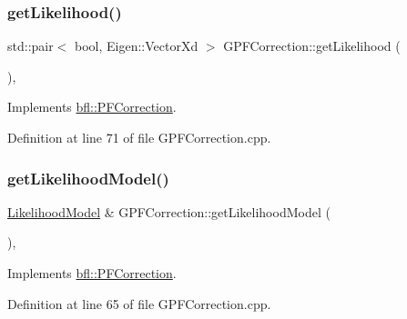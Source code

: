 \subsubsection{\texorpdfstring{get\+Likelihood()}{getLikelihood()}}
{\footnotesize\ttfamily std\+::pair$<$ bool, Eigen\+::\+Vector\+Xd $>$ G\+P\+F\+Correction\+::get\+Likelihood (\begin{DoxyParamCaption}{ }\end{DoxyParamCaption})\hspace{0.3cm}{\ttfamily [override]}, {\ttfamily [virtual]}}



Implements \mbox{\hyperlink{classbfl_1_1PFCorrection_ab6eca766077c4ab1db3417dab6c44d27}{bfl\+::\+P\+F\+Correction}}.



Definition at line 71 of file G\+P\+F\+Correction.\+cpp.

\mbox{\label{classbfl_1_1GPFCorrection_afa1e971c9b618c50bd98f1d5774cff3a}} 
\subsubsection{\texorpdfstring{get\+Likelihood\+Model()}{getLikelihoodModel()}}
{\footnotesize\ttfamily \mbox{\hyperlink{classbfl_1_1LikelihoodModel}{Likelihood\+Model}} \& G\+P\+F\+Correction\+::get\+Likelihood\+Model (\begin{DoxyParamCaption}{ }\end{DoxyParamCaption})\hspace{0.3cm}{\ttfamily [override]}, {\ttfamily [virtual]}}



Implements \mbox{\hyperlink{classbfl_1_1PFCorrection_ad812d0b488e0882b246dd19d4f6818e1}{bfl\+::\+P\+F\+Correction}}.



Definition at line 65 of file G\+P\+F\+Correction.\+cpp.

\mbox{\label{classbfl_1_1GPFCorrection_a670298795b61fab434eefd192b7fe81f}} 
